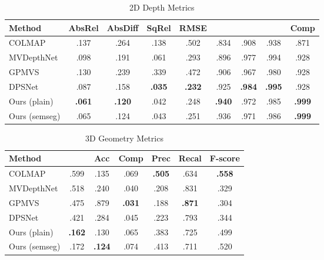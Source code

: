 \documentclass[runningheads]{llncs}
\begin{document}
\begin{table}[]
\centering
\caption{2D Depth Metrics
}
\begin{tabular}{lcccccccc}
\hline
Method & AbsRel & AbsDiff & SqRel & RMSE &  &  &  & Comp\\
\hline
COLMAP \cite{schoenberger2016mvs}    & .137 & .264 & .138 & .502 & .834 & .908 & .938 & .871 \\
MVDepthNet \cite{wang2018mvdepthnet} & .098 & .191 & .061 & .293 & .896 & .977 & .994 & .928 \\
GPMVS \cite{hou2019multi}            & .130 & .239 & .339 & .472 & .906 & .967 & .980 & .928 \\
DPSNet \cite{im2019dpsnet}           & .087 & .158 & \textbf{.035} & \textbf{.232} & .925 & \textbf{.984} & \textbf{.995} & .928 \\
\midrule
Ours (plain)                         & \textbf{.061} & \textbf{.120} & .042 & .248 & \textbf{.940} & .972 & .985 &  \textbf{.999} \\
Ours (semseg)                        & .065 & .124 & .043 & .251 & .936 & .971 & .986 & \textbf{.999} \\
\hline

\end{tabular}

\label{tab:results_depth}
\end{table}

 
\begin{table}[]
\centering
\caption{3D Geometry Metrics
}
\begin{tabular}{lcccccc}
\hline
Method &  & Acc & Comp & Prec & Recal & F-score \\
\hline
COLMAP \cite{schoenberger2016mvs}    & .599 & .135 & .069 & \textbf{.505} & .634 & \textbf{.558} \\
MVDepthNet \cite{wang2018mvdepthnet} & .518 & .240 & .040 & .208 & .831 & .329 \\
GPMVS \cite{hou2019multi}            & .475 & .879 & \textbf{.031} & .188 & \textbf{.871} & .304 \\
DPSNet \cite{im2019dpsnet}           & .421 & .284 & .045 & .223 & .793 & .344 \\
\midrule
Ours (plain)                         & \textbf{.162} & .130 & .065 & .383 & .725 & .499 \\
Ours (semseg)                        & .172 & \textbf{.124} & .074 & .413 & .711 & .520 \\
\hline
\end{tabular}
\label{tab:results_geo}
\end{table}
\end{document}
